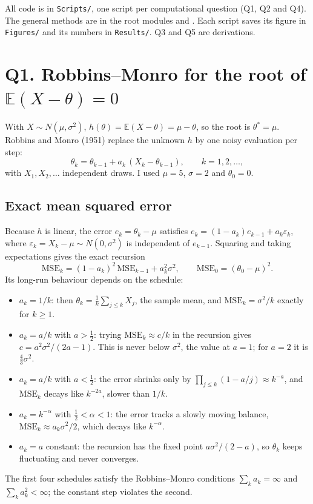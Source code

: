 \documentclass[11pt]{article}
\newcommand{\E}{\mathbb{E}}
\begin{document}
All code is in \texttt{Scripts/}, one script per computational question (Q1, Q2 and Q4). The general methods
are in the root modules  and . Each
script saves its figure in \texttt{Figures/} and its numbers in \texttt{Results/}. Q3 and Q5 are derivations.

\section*{Q1. Robbins--Monro for the root of $\E(X-\theta)=0$}

With $X\sim N(\mu,\sigma^2)$, $h(\theta)=\E(X-\theta)=\mu-\theta$, so the root is $\theta^*=\mu$. Robbins and
Monro (1951) replace the unknown $h$ by one noisy evaluation per step:
\[
\theta_k=\theta_{k-1}+a_k\,(X_k-\theta_{k-1}),\qquad k=1,2,\ldots,
\]
with $X_1,X_2,\ldots$ independent draws. I used $\mu=5$, $\sigma=2$ and $\theta_0=0$.

\subsection*{Exact mean squared error}

Because $h$ is linear, the error $e_k=\theta_k-\mu$ satisfies
$e_k=(1-a_k)e_{k-1}+a_k\varepsilon_k$, where $\varepsilon_k=X_k-\mu\sim N(0,\sigma^2)$ is independent of
$e_{k-1}$. Squaring and taking expectations gives the exact recursion
\[
\mathrm{MSE}_k=(1-a_k)^2\,\mathrm{MSE}_{k-1}+a_k^2\sigma^2,\qquad \mathrm{MSE}_0=(\theta_0-\mu)^2.
\]
Its long-run behaviour depends on the schedule:
\begin{itemize}
\item $a_k=1/k$: then $\theta_k=\frac1k\sum_{j\le k}X_j$, the sample mean, and $\mathrm{MSE}_k=\sigma^2/k$
exactly for $k\ge1$.
\item $a_k=a/k$ with $a>\tfrac12$: trying $\mathrm{MSE}_k\approx c/k$ in the recursion gives
$c=a^2\sigma^2/(2a-1)$. This is never below $\sigma^2$, the value at $a=1$; for $a=2$ it is
$\tfrac43\sigma^2$.
\item $a_k=a/k$ with $a<\tfrac12$: the error shrinks only by $\prod_{j\le k}(1-a/j)\approx k^{-a}$, and
$\mathrm{MSE}_k$ decays like $k^{-2a}$, slower than $1/k$.
\item $a_k=k^{-\alpha}$ with $\tfrac12<\alpha<1$: the error tracks a slowly moving balance,
$\mathrm{MSE}_k\approx a_k\sigma^2/2$, which decays like $k^{-\alpha}$.
\item $a_k=a$ constant: the recursion has the fixed point $a\sigma^2/(2-a)$, so $\theta_k$ keeps fluctuating
and never converges.
\end{itemize}
The first four schedules satisfy the Robbins--Monro conditions $\sum_k a_k=\infty$ and $\sum_k a_k^2<\infty$;
the constant step violates the second.
\end{document}
